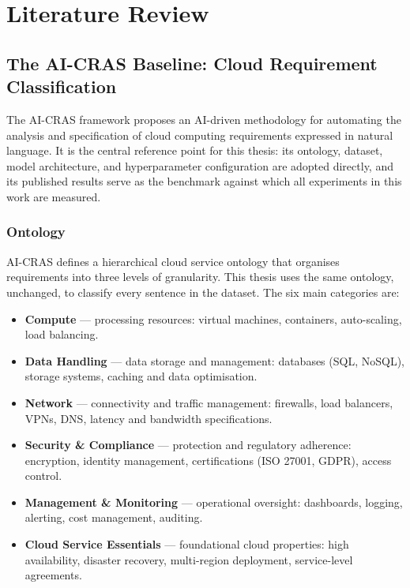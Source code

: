 \chapter{Literature Review}

\section{The AI-CRAS Baseline: Cloud Requirement Classification}

The AI-CRAS framework \cite{casalicchio2024aicras} proposes an AI-driven methodology for automating the analysis and specification of cloud computing requirements expressed in natural language. It is the central reference point for this thesis: its ontology, dataset, model architecture, and hyperparameter configuration are adopted directly, and its published results serve as the benchmark against which all experiments in this work are measured.

\subsection{Ontology}

AI-CRAS defines a hierarchical cloud service ontology that organises requirements into three levels of granularity. This thesis uses the same ontology, unchanged, to classify every sentence in the dataset. The six main categories are:

\begin{itemize}
    \item \textbf{Compute} — processing resources: virtual machines, containers, auto-scaling, load balancing.
    \item \textbf{Data Handling} — data storage and management: databases (SQL, NoSQL), storage systems, caching and data optimisation.
    \item \textbf{Network} — connectivity and traffic management: firewalls, load balancers, VPNs, DNS, latency and bandwidth specifications.
    \item \textbf{Security \& Compliance} — protection and regulatory adherence: encryption, identity management, certifications (ISO 27001, GDPR), access control.
    \item \textbf{Management \& Monitoring} — operational oversight: dashboards, logging, alerting, cost management, auditing.
    \item \textbf{Cloud Service Essentials} — foundational cloud properties: high availability, disaster recovery, multi-region deployment, service-level agreements.
\end{itemize}

